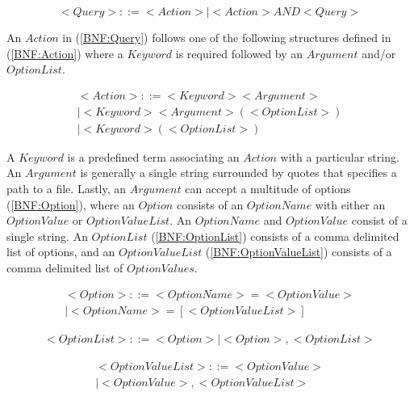 \begin{equation} \label{BNF:Query}
<Query> ::= <Action> | <Action> AND <Query>
\end{equation}

An \(Action\) in (\ref{BNF:Query}) follows one of the following structures defined in (\ref{BNF:Action}) where a \(Keyword\) is required followed by an \(Argument\) and/or \(OptionList\).

\begin{equation} \label{BNF:Action}
\begin{split}
<Action> ::= <Keyword> <Argument> \\
| <Keyword> <Argument> (<Option List>) \\
| <Keyword> (<Option List>)
\end{split}
\end{equation}

A \(Keyword\) is a predefined term associating an \(Action\) with a particular string. An \(Argument\) is generally a single string surrounded by quotes that specifies a path to a file. Lastly,  an \(Argument\) can accept a multitude of options (\ref{BNF:Option}), where an \(Option\) consists of an \(OptionName\) with either an \(OptionValue\) or \(OptionValueList\). An \(OptionName\) and \(OptionValue\) consist of a single string. An \(OptionList\) (\ref{BNF:OptionList}) consists of a comma delimited list of options, and an \(OptionValueList\) (\ref{BNF:OptionValueList}) consists of a comma delimited list of \(OptionValues\).

\begin{equation} \label{BNF:Option}
\begin{split}
<Option> ::= <Option Name> = <Option Value> \\
		| <Option Name> = [<Option Value List>]
\end{split}
\end{equation}

\begin{equation} \label{BNF:OptionList}
\begin{split}
	<Option List> ::= <Option> | <Option>,  <Option List>
\end{split}
\end{equation}

\begin{equation} \label{BNF:OptionValueList}
\begin{split}
<Option Value List> ::= <Option Value> \\
| <Option Value> ,  <Option Value List>
\end{split}
\end{equation}

